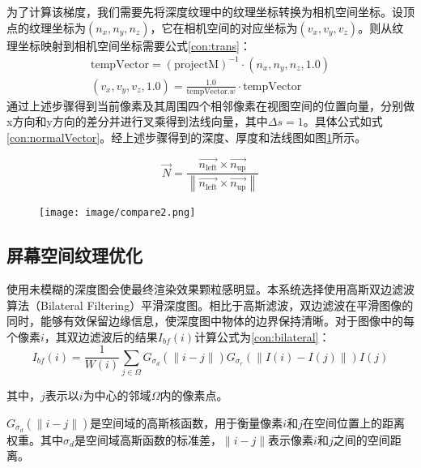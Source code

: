 为了计算该梯度，我们需要先将深度纹理中的纹理坐标转换为相机空间坐标。设顶点的纹理坐标为$(n_x,n_y,n_z)$，它在相机空间的对应坐标为$(v_x,v_y,v_z)$。则从纹理坐标映射到相机空间坐标需要公式\ref{con:trans}：
\begin{equation}
    \begin{aligned}
    \text{tempVector} = (\text{projectM})^{-1}\cdot (n_x,n_y,n_z,1.0) \\
    (v_x,v_y,v_z,1.0) = \frac{1.0}{\text{tempVector}.w} \cdot \text{tempVector}
    \end{aligned}
    \label{con:trans}
\end{equation}
通过上述步骤得到当前像素及其周围四个相邻像素在视图空间的位置向量，分别做x方向和y方向的差分并进行叉乘得到法线向量，其中$\Delta s = 1$。具体公式如式\ref{con:normalVector}。经上述步骤得到的深度、厚度和法线图如图\ref{fig:compare2}所示。

\begin{equation}
    \vec{N}=\frac{\vec{n_{\text{left}}} \times \vec{n_{\text{up}}}}{\left\|\vec{n_{\text{left}}} \times \vec{n_{\text{up}}}\right\|}
    \label{con:normalVector}
\end{equation}

\begin{figure}[ht]
    \centering
    \texttt{[image: image/compare2.png]}
    \label{fig:compare2}
\end{figure}


\subsection{屏幕空间纹理优化}
使用未模糊的深度图会使最终渲染效果颗粒感明显。本系统选择使用高斯双边滤波算法（Bilateral Filtering）平滑深度图。相比于高斯滤波，双边滤波在平滑图像的同时，能够有效保留边缘信息，使深度图中物体的边界保持清晰。对于图像中的每个像素$i$，其双边滤波后的结果$I_{bf}(i)$计算公式为\ref{con:bilateral}：
\begin{equation}
    I_{bf}(i)=\frac{1}{W(i)}\sum_{j\in\Omega}G_{\sigma_d}(\left \| i - j \right \|)G_{\sigma_r}(\left \| I(i)-I(j) \right \|)I(j)
    \label{con:bilateral}
\end{equation}

其中，$j$表示以$i$为中心的邻域$\Omega$内的像素点。

$G_{\sigma_d}(\left \| i - j \right \|)$是空间域的高斯核函数，用于衡量像素$i$和$j$在空间位置上的距离权重。其中$\sigma_d$是空间域高斯函数的标准差，$\left \| i - j \right \|$表示像素$i$和$j$之间的空间距离。

